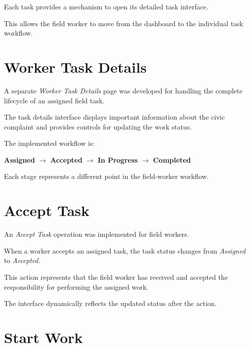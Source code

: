 \documentclass[12pt,a4paper]{article}
\begin{document}
Each task provides a mechanism to open its detailed task interface.

This allows the field worker to move from the dashboard to the individual
task workflow.

\section{Worker Task Details}

A separate \textit{Worker Task Details} page was developed for handling the
complete lifecycle of an assigned field task.

The task details interface displays important information about the civic
complaint and provides controls for updating the work status.

The implemented workflow is:

\begin{center}
\textbf{Assigned}
$\rightarrow$
\textbf{Accepted}
$\rightarrow$
\textbf{In Progress}
$\rightarrow$
\textbf{Completed}
\end{center}

Each stage represents a different point in the field-worker workflow.

\section{Accept Task}

An \textit{Accept Task} operation was implemented for field workers.

When a worker accepts an assigned task, the task status changes from
\textit{Assigned} to \textit{Accepted}.

This action represents that the field worker has received and accepted the
responsibility for performing the assigned work.

The interface dynamically reflects the updated status after the action.

\section{Start Work}
\end{document}
